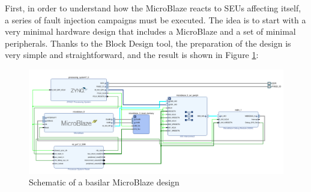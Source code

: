 First, in order to understand how the MicroBlaze reacts to SEUs affecting itself, a series of fault injection campaigns must be executed. The idea is to start with a very minimal hardware design that includes a MicroBlaze and a set of minimal peripherals. Thanks to the Block Design tool, the preparation of the design is very simple and straightforward, and the result is shown in Figure \ref{fig:base_mb}:

\begin{figure}[H]
\centering
\includegraphics[width=1.0\linewidth]{images/chapter4/mb_base_design_edit.pdf}
\caption{Schematic of a basilar MicroBlaze design}
\label{fig:base_mb}
\end{figure}


